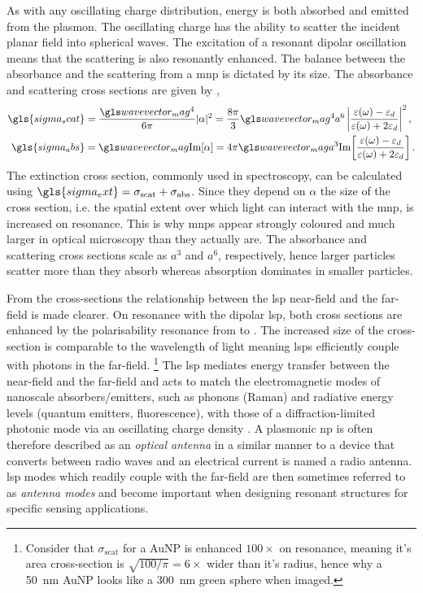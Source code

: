 \documentclass{article}
\begin{document}
As with any oscillating charge distribution, energy is both absorbed and emitted from the plasmon. The oscillating charge has the ability to scatter the incident planar field into spherical waves. The excitation of a resonant dipolar oscillation means that the scattering is also resonantly enhanced. The balance between the absorbance and the scattering from a \gls{mnp} is dictated by its size. The absorbance and scattering cross sections are given by \cite{bohren2008absorption},
\begin{subequations}
\begin{align}
\gls{sigma_scat} &= \frac{\wvm^4}{6\pi} |\alpha|^2 = \frac{8\pi}{3}\wvm^4a^6 \left| \frac{\dielectric - \epsdi}{\dielectric + 2\epsdi} \right|^2, \\
\gls{sigma_abs} &= \wvm\imag{\alpha} = 4\pi \wvm a^3 \imag{ \frac{\dielectric - \epsdi}{\dielectric + 2\epsdi} }.
\end{align}
\end{subequations}
The extinction cross section, commonly used in spectroscopy, can be calculated using $\gls{sigma_ext}=\sigma_{\mathrm{scat}}+\sigma_{\mathrm{abs}}$. Since they depend on $\alpha$ the size of the cross section, i.e. the spatial extent over which light can interact with the \gls{mnp}, is increased on resonance. This is why \glspl{mnp} appear strongly coloured and much larger in optical microscopy than they actually are. The absorbance and scattering cross sections scale as $a^3$ and $a^6$, respectively, hence larger particles scatter more than they absorb whereas absorption dominates in smaller particles.

From the cross-sections the relationship between the \gls{lsp} near-field and the far-field is made clearer. On resonance with the dipolar \gls{lsp}, both cross sections are enhanced by the polarisability resonance from  to . The increased size of the cross-section is comparable to the wavelength of light meaning \glspl{lsp} efficiently couple with photons in the far-field.%
\footnote{Consider that $\sigma_{\mathrm{scat}}$ for a AuNP is enhanced $100\times$ on resonance, meaning it's area cross-section is $\sqrt{100/\pi}= 6\times$ wider than it's radius, hence why a \SI{50}{nm} AuNP looks like a \SI{300}{nm} green sphere when imaged.}
The \gls{lsp} mediates energy transfer between the near-field and the far-field and acts to match the electromagnetic modes of nanoscale absorbers/emitters, such as phonons (Raman) and radiative energy levels (quantum emitters, fluorescence), with those of a diffraction-limited photonic mode via an oscillating charge density \cite{berweger2012}. A plasmonic \gls{np} is often therefore described as an \textit{optical antenna} in a similar manner to a device that converts between radio waves and an electrical current is named a radio antenna. \Gls{lsp} modes which readily couple with the far-field are then sometimes referred to as \emph{antenna modes} and become important when designing resonant structures for specific sensing applications.
\end{document}
